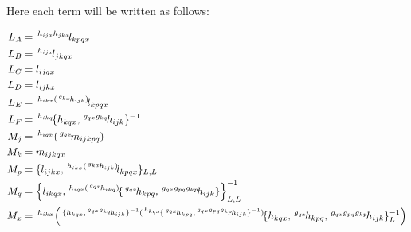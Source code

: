 \documentclass{tac}
\newcommand{\act}[1]{\,\sp{#1}\!}
\begin{document}
\begin{itemize}
\begin{enumerate}[label=(\alph*)]
Here each term will be written as follows:

\noindent
\begin{align*}
     L_A &= \act{h_{ijx}h_{jkx}}l_{kpqx}\\
   L_B &= \act{h_{ijx}}l_{jkqx}\\
   L_C &=l_{ijqx}\\
   L_D &=l_{ijkx}\\
   L_E &=\act{h_{ikx}(\act{g_{kx}}h_{ijk})}l_{kpqx}\\
   L_F &=\act{h_{ikq}}\{h_{kqx}, \act{g_{qx}g_{kq}}h_{ijk} \}^{-1}\\
   M_j &= \act{h_{iqx}}\left(\act{g_{qx}}m_{ijkpq} \right)\\
   M_k &= m_{ijkqx}\\
   M_p &= \{l_{ijkx}, \act{h_{ikx}(\act{g_{kx}}h_{ijk})}l_{kpqx} \}_{L,L}\\
   M_q &= \left\{l_{ikqx},\act{h_{iqx}(\act{g_{qx}}h_{ikq})}\{\act{g_{qx}}h_{kpq},\act{g_{qx}g_{pq}g_{kp}}h_{ijk} \} \right\}^{-1}_{L,L}\\
   M_x &=\act{h_{ikx}}\left(\act{\{h_{kqx},\act{g_{qx}g_{kq}}h_{ijk} \}^{-1}(\act{h_{kqx}}\{\act{g_{qx}}h_{kpq},\act{g_{qx}g_{pq}g_{kp}}h_{ijk} \}^{-1})} \{h_{kqx}, \act{g_{qx}}h_{kpq}, \act{g_{qx}g_{pq}g_{kp}}h_{ijk} \}_L^{-1}\right)
    \end{align*}
   

\end{enumerate}
\end{itemize}
\end{document}
